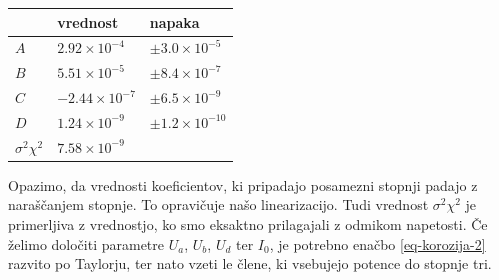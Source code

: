 \documentclass[slovene,11pt,a4paper]{article}
\numberwithin{equation}{section} %
\numberwithin{figure}{section} %
\numberwithin{table}{section} %
\begin{document}
\begin{table}[h]
\begin{center}
\begin{tabular}{|l|l|l|}
\hline
 & vrednost & napaka \\ \hline
$A$ & $2.92\times 10^{-4}$ & $\pm3.0\times 10^{-5}$ \\ \hline
$B$ & $5.51\times 10^{-5}$ & $\pm8.4\times 10^{-7}$ \\ \hline
$C$ & $-2.44\times 10^{-7}$ & $\pm6.5\times 10^{-9}$ \\ \hline
$D$ & $1.24\times 10^{-9}$ & $\pm1.2\times 10^{-10}$ \\ \hline
$\sigma^2 \chi^2$ & $7.58\times 10^{-9}$ &  \\ \hline
\end{tabular}
\end{center}
\end{table}
Opazimo, da vrednosti koeficientov, ki pripadajo posamezni stopnji padajo z naraščanjem stopnje. To opravičuje našo linearizacijo. Tudi vrednost $\sigma^2 \chi^2$ je primerljiva z vrednostjo, ko smo eksaktno prilagajali z odmikom napetosti. Če želimo določiti parametre $U_a$, $U_b$, $U_d$ ter $I_0$, je potrebno enačbo \ref{eq-korozija-2} razvito po Taylorju, ter nato vzeti le člene, ki vsebujejo potence do stopnje tri.


\end{document}

